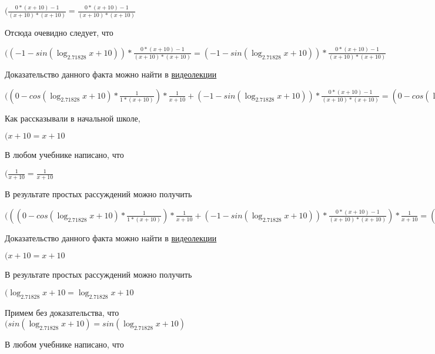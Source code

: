 \documentclass[12pt,a4paper,fleqn]{article}
\theoremstyle{definition}
\begin{document}
$(\frac{ 0  * ( x  +  10 ) -  1 }{( x  +  10 ) * ( x  +  10 )}
 = \frac{ 0  * ( x  +  10 ) -  1 }{( x  +  10 ) * ( x  +  10 )}
$

Отсюда очевидно следует, что

$(( -1  - sin(\log_{ 2.71828 }{ x  +  10 })) * \frac{ 0  * ( x  +  10 ) -  1 }{( x  +  10 ) * ( x  +  10 )}
 = ( -1  - sin(\log_{ 2.71828 }{ x  +  10 })) * \frac{ 0  * ( x  +  10 ) -  1 }{( x  +  10 ) * ( x  +  10 )}
$

Доказательство данного факта можно найти в \href{https://www.youtube.com/watch?v=dQw4w9WgXcQ}{видеолекции}

$(( 0  - cos(\log_{ 2.71828 }{ x  +  10 }) * \frac{ 1 }{ 1  * ( x  +  10 )}
) * \frac{ 1 }{ x  +  10 }
 + ( -1  - sin(\log_{ 2.71828 }{ x  +  10 })) * \frac{ 0  * ( x  +  10 ) -  1 }{( x  +  10 ) * ( x  +  10 )}
 = ( 0  - cos(\log_{ 2.71828 }{ x  +  10 }) * \frac{ 1 }{ 1  * ( x  +  10 )}
) * \frac{ 1 }{ x  +  10 }
 + ( -1  - sin(\log_{ 2.71828 }{ x  +  10 })) * \frac{ 0  * ( x  +  10 ) -  1 }{( x  +  10 ) * ( x  +  10 )}
$

Как рассказывали в начальной школе,

$( x  +  10  =  x  +  10 $

В любом учебнике написано, что

$(\frac{ 1 }{ x  +  10 }
 = \frac{ 1 }{ x  +  10 }
$

В результате простых рассуждений можно получить

$((( 0  - cos(\log_{ 2.71828 }{ x  +  10 }) * \frac{ 1 }{ 1  * ( x  +  10 )}
) * \frac{ 1 }{ x  +  10 }
 + ( -1  - sin(\log_{ 2.71828 }{ x  +  10 })) * \frac{ 0  * ( x  +  10 ) -  1 }{( x  +  10 ) * ( x  +  10 )}
) * \frac{ 1 }{ x  +  10 }
 = (( 0  - cos(\log_{ 2.71828 }{ x  +  10 }) * \frac{ 1 }{ 1  * ( x  +  10 )}
) * \frac{ 1 }{ x  +  10 }
 + ( -1  - sin(\log_{ 2.71828 }{ x  +  10 })) * \frac{ 0  * ( x  +  10 ) -  1 }{( x  +  10 ) * ( x  +  10 )}
) * \frac{ 1 }{ x  +  10 }
$

Доказательство данного факта можно найти в \href{https://www.youtube.com/watch?v=dQw4w9WgXcQ}{видеолекции}

$( x  +  10  =  x  +  10 $

В результате простых рассуждений можно получить

$(\log_{ 2.71828 }{ x  +  10 } = \log_{ 2.71828 }{ x  +  10 }$

Примем без доказательства, что
$(sin(\log_{ 2.71828 }{ x  +  10 }) = sin(\log_{ 2.71828 }{ x  +  10 })$

В любом учебнике написано, что
\end{document}
